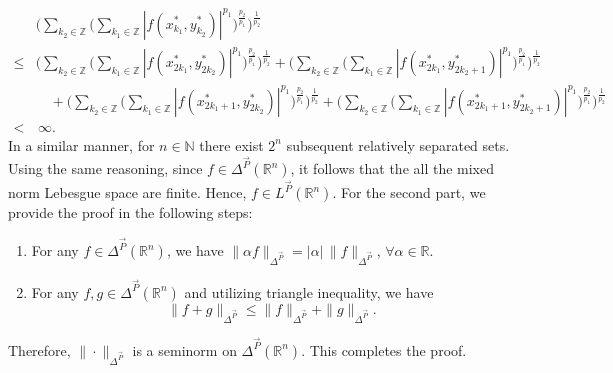 \documentclass[10pt,a4paper]{amsart}
\def\NN{\mathbb N}
\def\RR{\mathbb R}
\renewenvironment{proof}{{\raggedright \bfseries Proof.}}{\qedwhite}
\newcommand{\vc}[1]{\overrightarrow{#1}}
\begin{document}
\begin{proof}
\begin{align*}
        &\Bigg( \sum_{k_2 \in \mathbb{Z}}\Bigg( \sum_{k_1 \in \mathbb{Z}} |f(x_{k_1}^*, y_{k_2}^*)|^{p_1} \Bigg)^{\frac{p_2}{p_1}}\Bigg)^{\frac{1}{p_2}}\\
        \leq& \Bigg( \sum_{k_2 \in \mathbb{Z}}\Bigg(\sum_{k_1 \in \mathbb{Z}}  |f(x_{2k_1}^*, y_{2k_2}^*)|^{p_1} \Bigg)^{\frac{p_2}{p_1}}\Bigg)^{\frac{1}{p_2}} + \Bigg(\sum_{k_2 \in \mathbb{Z}}\Bigg(\sum_{k_1 \in \mathbb{Z}}   |f(x_{2k_1}^*, y_{2k_2+1}^*)|^{p_1} \Bigg)^{\frac{p_2}{p_1}}\Bigg)^{\frac{1}{p_2}} \\
        &\quad + \Bigg(\sum_{k_2 \in \mathbb{Z}} \Bigg( \sum_{k_1 \in \mathbb{Z}} |f(x_{2k_1+1}^*, y_{2k_2}^*)|^{p_1} \Bigg)^{\frac{p_2}{p_1}}\Bigg)^{\frac{1}{p_2}} + \Bigg( \sum_{k_2 \in \mathbb{Z}}\Bigg(\sum_{k_1 \in \mathbb{Z}}  |f(x_{2k_1+1}^*, y_{2k_2+1}^*)|^{p_1} \Bigg)^{\frac{p_2}{p_1}}\Bigg)^{\frac{1}{p_2}}\\
        <&\, \infty.
    \end{align*}
    In a similar manner, for $n\in \NN$ there exist $2^n$ subsequent relatively separated sets. Using the same reasoning, since  $f\in \Delta^{\vc{P}}(\RR^n)$, it follows that the all the mixed norm Lebesgue space are finite. Hence, $f\in L^{\vc{P}}(\RR^n)$. 
    For the second part, we provide the proof in the following steps:
    \begin{enumerate}[label=(\roman*), left=0pt]

        \item For any $f\in \Delta^{\vc{P}}(\RR^n)$, we have 
        $\|\alpha f\|_{\Delta^{\vc{P}}}= |\alpha|  \hspace{2pt} \|f\|_{\Delta^{\vc{P}}}$,  
        $ \forall \alpha \in \RR$. 
        
        \item For any $f, g\in \Delta^{\vc{P}}(\RR^n)$ and utilizing triangle inequality, we have 
        $$\|f+g\|_{\Delta^{\vc{P}}} \leq \|f\|_{\Delta^{\vc{P}}}+\|g\|_{\Delta^{\vc{P}}}.$$
    \end{enumerate}
    Therefore, $\|\cdot\|_{\Delta^{\vc{P}}} $ is a seminorm on $\Delta^{\vc{P}}(\RR^n)$. This completes the proof.
\end{proof}
\end{document}
